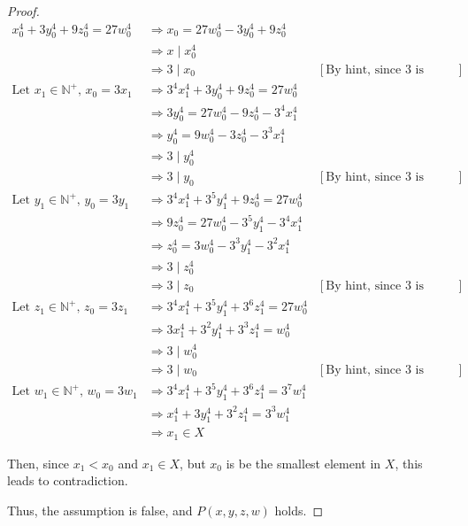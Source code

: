 \documentclass[12pt]{article}
\begin{document}
\begin{itemize}
\begin{proof}
    \begin{align}
        x_0^4 + 3y_0^4 + 9z_0^4 = 27w_0^4 &\Rightarrow x_0 = 27w_0^4 - 3y_0^4 + 9z_0^4\\
        &\Rightarrow x \mid x_0^4\\
        &\Rightarrow 3 \mid x_0 & [\text{By hint, since 3 is prime}]\\[1em]
        \text{Let $x_1 \in \mathbb{N}^+$, $x_0 = 3x_1$} &\Rightarrow 3^4x_1^4 + 3y_0^4 + 9z_0^4 = 27w_0^4\\
        &\Rightarrow 3y_0^4 = 27w_0^4 - 9z_0^4 - 3^4x_1^4\\
        &\Rightarrow y_0^4 = 9w_0^4 - 3z_0^4 - 3^3x_1^4\\
        &\Rightarrow 3 \mid y_0^4\\
        &\Rightarrow 3 \mid y_0 & [\text{By hint, since 3 is prime}]\\[1em]
        \text{Let $y_1 \in \mathbb{N}^+$, $y_0 = 3y_1$} &\Rightarrow 3^4x_1^4 + 3^5y_1^4 + 9z_0^4 = 27w_0^4\\
        &\Rightarrow 9z_0^4 = 27w_0^4 - 3^5y_1^4 - 3^4x_1^4\\
        &\Rightarrow z_0^4 = 3w_0^4 - 3^3y_1^4 - 3^2x_1^4\\
        &\Rightarrow 3 \mid z_0^4\\
        &\Rightarrow 3 \mid z_0 & [\text{By hint, since 3 is prime}]\\[1em]
        \text{Let $z_1 \in \mathbb{N}^+$, $z_0 = 3z_1$} &\Rightarrow 3^4x_1^4 + 3^5y_1^4 + 3^6z_1^4 = 27w_0^4\\
        &\Rightarrow 3x_1^4 + 3^2y_1^4 + 3^3z_1^4 = w_0^4\\
        &\Rightarrow 3 \mid w_0^4\\
        &\Rightarrow 3 \mid w_0 & [\text{By hint, since 3 is prime}]\\[1em]
        \text{Let $w_1 \in \mathbb{N}^+$, $w_0 = 3w_1$} &\Rightarrow 3^4x_1^4 + 3^5y_1^4 + 3^6z_1^4 = 3^7w_1^4\\
        &\Rightarrow x_1^4 + 3y_1^4 + 3^2z_1^4 = 3^3w_1^4\\
        &\Rightarrow x_1 \in X
    \end{align}

    \bigskip

    Then, since $x_1 < x_0$ and $x_1 \in X$, but $x_0$ is be the smallest element in $X$,
    this leads to contradiction.

    \bigskip

    Thus, the assumption is false, and $P(x,y,z,w)$ holds.
    \end{proof}


\end{itemize}
\end{document}
